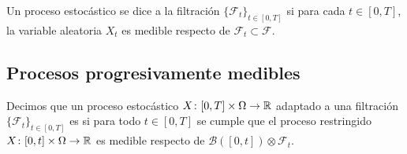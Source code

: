 \begin{definicion}
    \label{def:proceso_adaptado}
    Un proceso estocástico se dice  a la filtración $\{\mathcal{F}_t\}_{t\in[0,T]}$ si para cada $t\in[0,T]$, la variable aleatoria $X_t$ es medible respecto de $\mathcal{F}_t\subset\mathcal{F}$.
\end{definicion}
\subsection{Procesos progresivamente medibles}
\begin{definicion}
    Decimos que un proceso estocástico $X\colon[0,T]\times\Omega\to\mathbb{R}$ adaptado a una filtración $\{\mathcal{F}_t\}_{t\in[0,T]}$ es  si para todo $t\in[0,T]$ se cumple que el proceso restringido $X\colon[0,t]\times\Omega\to\mathbb{R}$ es medible respecto de $\mathcal{B}([0,t])\otimes\mathcal{F}_t$.
\end{definicion}

